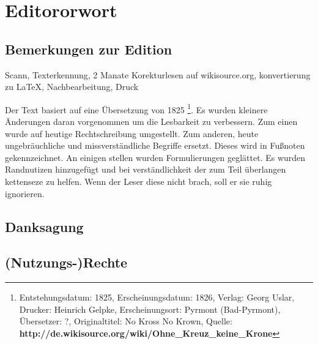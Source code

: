 \part{Editororwort}


\chapter{Bemerkungen zur Edition}
Scann, Texterkennung, 2 Manate Korekturlesen auf wikisource.org, konvertierung zu LaTeX, Nachbearbeitung, Druck

Der Text basiert auf eine Übersetzung von 1825 \footnote{Entstehungsdatum: 1825, Erscheinungsdatum: 1826, Verlag: Georg Uslar, Drucker: Heinrich Gelpke, Erscheinungsort: Pyrmont (Bad-Pyrmont), Übersetzer: ?, Originaltitel: No Kross No Krown, Quelle:
\textbf{http://de.wikisource.org/wiki/Ohne\_Kreuz\_keine\_Krone}}. Es wurden kleinere Änderungen daran vorgenommen um die Lesbarkeit zu verbessern. Zum einen wurde auf heutige Rechtschreibung umgestellt. Zum anderen, heute ungebräuchliche und missverständliche Begriffe ersetzt. Dieses wird in Fußnoten gekennzeichnet. An einigen stellen wurden Formulierungen geglättet. Es wurden Randnutizen hinzugefügt und bei verständlichkeit der zum Teil überlangen kettenseze zu helfen. Wenn der Leser diese nicht brach, soll er sie ruhig ignorieren. 

\chapter{Danksagung}

\chapter{(Nutzungs-)Rechte}

